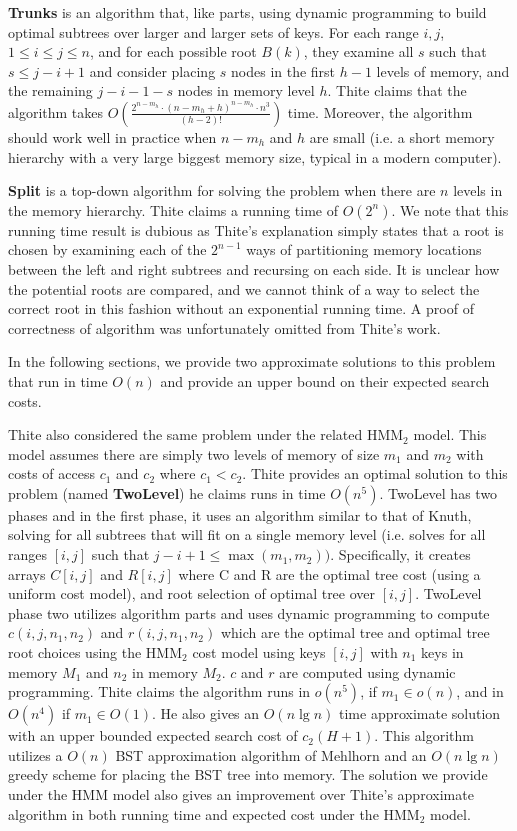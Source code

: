 \documentclass[letterpaper,12pt,titlepage,oneside,final]{book}
\theoremstyle{plain}
\begin{document}
\textbf{Trunks} is an algorithm that, like parts, using dynamic programming to build optimal subtrees over larger and larger sets of keys. For each range $i,j$, $1 \leq i \leq j \leq n$, and for each possible root $B(k)$, they examine all $s$ such that $s \leq j-i+1$ and consider placing $s$ nodes in the first $h-1$ levels of memory, and the remaining $j-i-1-s$ nodes in memory level $h$. Thite claims that the algorithm takes $O(\frac{2^{n-m_h}\cdot (n-m_h+h)^{n-m_h}\cdot n^3}{(h-2)!})$ time. Moreover, the algorithm should work well in practice when $n-m_h$ and $h$ are small (i.e. a short memory hierarchy with a very large biggest memory size, typical in a modern computer).

\textbf{Split} is a top-down algorithm for solving the problem when there are $n$ levels in the memory hierarchy. Thite claims a running time of $O(2^n)$. We note that this running time result is dubious as Thite's explanation simply states that a root is chosen by examining each of the $2^{n-1}$ ways of partitioning memory locations between the left and right subtrees and recursing on each side. It is unclear how the potential roots are compared, and we cannot think of a way to select the correct root in this fashion without an exponential running time. A proof of correctness of algorithm was unfortunately omitted from Thite's work.

 In the following sections, we provide two approximate solutions to this problem that run in time $O(n)$ and provide an upper bound on their expected search costs. 
 
Thite also considered the same problem under the related HMM$_2$ model. This model assumes there are simply two levels of memory of size $m_1$ and $m_2$ with costs of access $c_1$ and $c_2$ where $c_1 < c_2$. Thite provides an optimal solution to this problem (named \textbf{TwoLevel}) he claims runs in time $O(n^5)$.
TwoLevel has two phases and in the first phase, it uses an algorithm similar to that of Knuth, solving for all subtrees that will fit on a single memory level (i.e. solves for all ranges $[i,j]$ such that $j-i+1 \leq \max(m_1, m_2))$. Specifically, it creates arrays $C[i,j]$ and $R[i,j]$ where C and R are the optimal tree cost (using a uniform cost model), and root selection of optimal tree over $[i,j]$.
TwoLevel phase two utilizes algorithm parts and uses dynamic programming to compute $c(i,j,n_1,n_2)$ and $r(i,j,n_1, n_2)$ which are the optimal tree and optimal tree root choices using the HMM$_2$ cost model using keys $[i,j]$ with $n_1$ keys in memory $M_1$ and $n_2$ in memory $M_2$. $c$ and $r$ are computed using dynamic programming. Thite claims the algorithm runs in $o(n^5)$, if $m_1 \in o(n)$, and in $O(n^4)$ if $m_1 \in O(1)$. He also gives an $O(n\lg n)$ time approximate solution with an upper bounded expected search cost of $c_2(H+1)$. This algorithm utilizes a $O(n)$ BST approximation algorithm of Mehlhorn \cite{mehlhorn1984sorting} and an $O(n \lg n)$ greedy scheme for placing the BST tree into memory. The solution we provide under the HMM model also gives an improvement over Thite's approximate algorithm in both running time and expected cost under the HMM$_2$ model.
\end{document}
